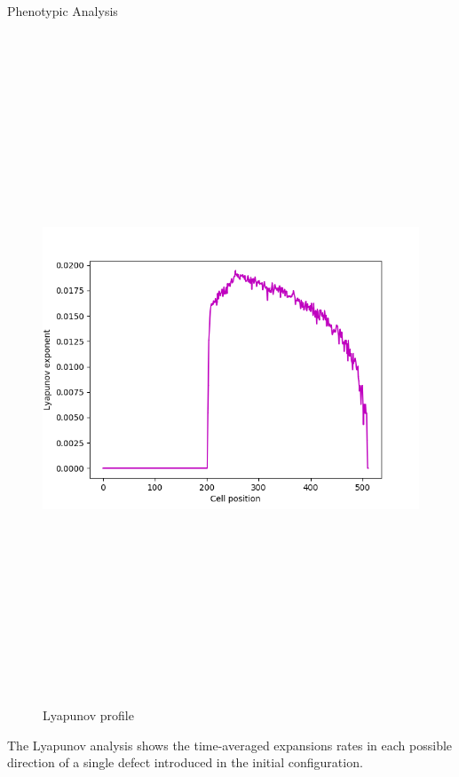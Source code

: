 \documentclass[12pt, letterpaper]{article}
\begin{document}
\begin{section}{Phenotypic Analysis}
\begin{figure}[H]
			\includegraphics[max width=200mm, max height=200mm, keepaspectratio]{SimLyapunovExp.png} 
		\caption{Lyapunov profile} 
		\end{figure} 
The Lyapunov analysis shows the time-averaged expansions rates in each possible direction of a single defect introduced in the initial configuration.    \end{section} 
    \clearpage 
\end{document}
